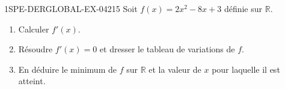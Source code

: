 \begin{exercice}{1SPE-DERGLOBAL-EX-042}{1}{5}
Soit $f(x) = 2x^2 - 8x + 3$ définie sur $\mathbb{R}$.
\begin{enumerate}
  \item Calculer $f'(x)$.
  \item Résoudre $f'(x) = 0$ et dresser le tableau de variations de $f$.
  \item En déduire le minimum de $f$ sur $\mathbb{R}$ et la valeur de $x$ pour laquelle il est atteint.
\end{enumerate}
\end{exercice}
